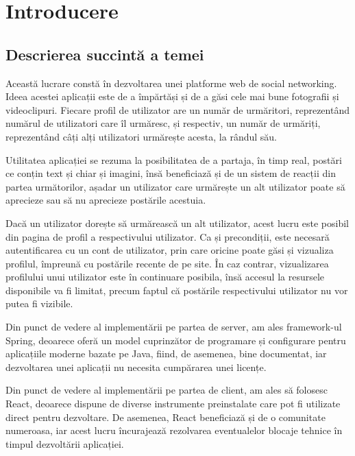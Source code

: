\chapter{Introducere}
\section{Descrierea succintă a temei}

Această lucrare constă în dezvoltarea unei platforme web de social networking. Ideea acestei aplicații este de a împărtăși și de a găsi cele mai bune fotografii și videoclipuri. Fiecare profil de utilizator are un număr de urmăritori, reprezentând numărul de utilizatori care îl urmăresc, și respectiv, un număr de urmăriți, reprezentând câți alți utilizatori urmărește acesta, la rândul său.\newline

Utilitatea aplicației se rezuma la posibilitatea de a partaja, în timp real, postări ce conțin text și chiar și imagini, însă beneficiază și de un sistem de reacții din partea următorilor, așadar un utilizator care urmărește un alt utilizator poate să aprecieze sau să nu aprecieze postările acestuia.\newline

Dacă un utilizator dorește să urmărească un alt utilizator, acest lucru este posibil din pagina de profil a respectivului utilizator. Ca și precondiții, este necesară autentificarea cu un cont de utilizator, prin care oricine poate găsi și vizualiza profilul, împreună cu postările recente de pe site. În caz contrar, vizualizarea profilului unui utilizator este în continuare posibila, însă accesul la resursele disponibile va fi limitat, precum faptul că postările respectivului utilizator nu vor putea fi vizibile.\newline

Din punct de vedere al implementării pe partea de server, am ales framework-ul Spring\cite{.springdoc}, deoarece oferă un model cuprinzător de programare și configurare pentru aplicațiile moderne bazate pe Java, fiind, de asemenea, bine documentat, iar dezvoltarea unei aplicații nu necesita cumpărarea unei licențe.\newline

Din punct de vedere al implementării pe partea de client, am ales să folosesc React\cite{.reactdoc}, deoarece dispune de diverse instrumente preinstalate care pot fi utilizate direct pentru dezvoltare. De asemenea, React beneficiază și de o comunitate numeroasa, iar acest lucru încurajează rezolvarea eventualelor blocaje tehnice în timpul dezvoltării aplicației.\newline

